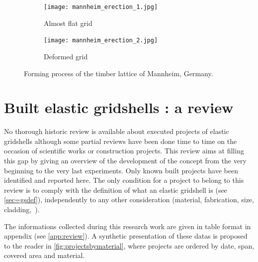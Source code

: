 


\begin{figure}[t]
	\begin{subfigure}[b]{\TwoMediaWidth}
		\texttt{[image: mannheim\_erection\_1.jpg]}
		\caption{Almost flat grid}
		\label{fig:erec_1}
	\end{subfigure}%
	\hspace{\MediaGutterWidth}%
	\begin{subfigure}[b]{\TwoMediaWidth}
		\texttt{[image: mannheim\_erection\_2.jpg]}
		\caption{Deformed grid}
		\label{fig:erec_2}
	\end{subfigure}
	\caption[Forming process of the timber lattice of Mannheim, Germany]{Forming process of the timber lattice of Mannheim, Germany.}
	\label{fig:multihalle}
\end{figure}


\clearpage

\section{Built elastic gridshells : a review}\label{sec=review_project}

No thorough historic review is available about executed projects of elastic gridshells although some partial reviews have been done time to time on the occasion of scientific works or construction projects. This review aims at filling this gap by giving an overview of the development of the concept from the very beginning to the very last experiments. Only known built projects have been identified and reported here. The only condition for a project to belong to this review is to comply with the definition of what an elastic gridshell is (see \cref{sec=gsdef}), independently to any other consideration (material, fabrication, size, cladding,~\telp{}).

The informations collected during this research work are given in table format in appendix (see \cref{app:review}). A synthetic presentation of these datas is proposed to the reader in \cref{fig:projectsbymaterial}, where projects are ordered by date, span, covered area and material.

